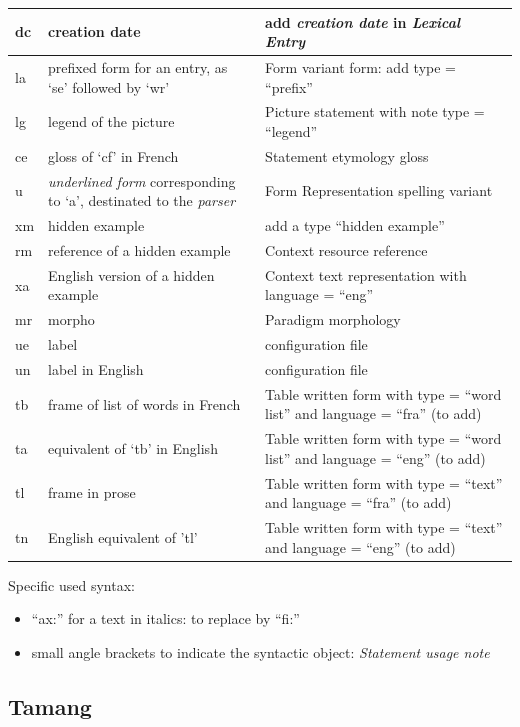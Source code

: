 \documentclass[a4paper,12pt]{article}
\begin{document}
\begin{center}
\begin{longtable}{|p{4cm}|p{5cm}|p{6cm}|}
dc & creation date & add \textit{creation date} in \textit{Lexical Entry} \\ \hline
la & prefixed form for an entry, as ‘se’ followed by `wr' & Form variant form: add type = “prefix” \\ \hline
lg & legend of the picture & Picture statement with note type = ``legend'' \\ \hline
ce & gloss of `cf' in French & Statement etymology gloss \\ \hline
u & \textit{underlined form} corresponding to ‘a’, destinated to the \textit{parser} & Form Representation spelling variant \\ \hline
xm & hidden example & add a type ``hidden example'' \\ \hline
rm & reference of a hidden example & Context resource reference \\ \hline
xa & English version of a hidden example & Context text representation with language = “eng” \\ \hline
mr & morpho & Paradigm morphology \\ \hline
ue & label & configuration file \\ \hline
un & label in English & configuration file \\ \hline
tb & frame of list of words in French & Table written form with type = ``word list'' and language = ``fra'' (to add) \\ \hline
ta & equivalent of ‘tb’ in English & Table written form with type = ``word list'' and language = ``eng'' (to add) \\ \hline
tl & frame in prose & Table written form with type = ``text'' and language = ``fra'' (to add) \\ \hline
tn & English equivalent of ’tl’ & Table written form with type = ``text'' and language = ``eng'' (to add) \\ \hline
\end{longtable}
\end{center}

Specific used syntax:
\begin{itemize}
\item ``ax:'' for a text in italics: to replace by ``fi:''
\item small angle brackets to indicate the syntactic object: \textit{Statement usage note}
\end{itemize}

\pagebreak

\subsection{Tamang}
\end{document}
